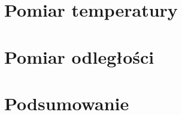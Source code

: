 \documentclass[12pt]{article}
\begin{document}



\section{Pomiar temperatury}

\section{Pomiar odległości}

\section{Podsumowanie}



\end{document}
